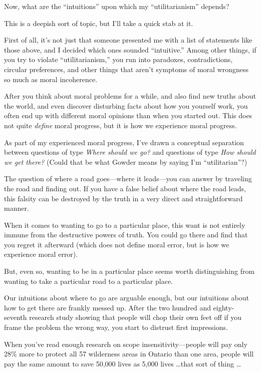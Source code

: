 {
 Now, what are the
``intuitions'' upon which my
``utilitarianism'' depends?}

{
 This is a deepish sort of topic, but I'll take a
quick stab at it.}

{
 First of all, it's not just that someone presented
me with a list of statements like those above, and I decided which ones
sounded ``intuitive.'' Among other
things, if you try to violate
``utilitarianism,'' you run into
paradoxes, contradictions, circular preferences, and other things that
aren't symptoms of moral wrongness so much as moral
incoherence.}

{
 After you think about moral problems for a while, and also find
new truths about the world, and even discover disturbing facts about
how you yourself work, you often end up with different moral opinions
than when you started out. This does not quite \textit{define} moral
progress, but it is how we experience moral progress.}

{
 As part of my experienced moral progress, I've
drawn a conceptual separation between questions of type \textit{Where
should we go?} and questions of type \textit{How should we get there?}
(Could that be what Gowder means by saying I'm
``utilitarian''?)}

{
 The question of where a road goes---where it leads---you can
answer by traveling the road and finding out. If you have a false
belief about where the road leads, this falsity can be destroyed by the
truth in a very direct and straightforward manner.}

{
 When it comes to wanting to go to a particular place, this want is
not entirely immune from the destructive powers of truth. You could go
there and find that you regret it afterward (which does not define
moral error, but is how we experience moral error).}

{
 But, even so, wanting to be in a particular place seems worth
distinguishing from wanting to take a particular road to a particular
place.}

{
 Our intuitions about where to go are arguable enough, but our
intuitions about how to get there are frankly messed up. After the two
hundred and eighty-seventh research study showing that people will chop
their own feet off if you frame the problem the wrong way, you start to
distrust first impressions.}

{
 When you've read enough research on scope
insensitivity---people will pay only 28\% more to protect all 57
wilderness areas in Ontario than one area, people will pay the same
amount to save 50,000 lives as 5,000 lives \ldots that sort of thing
\ldots}

